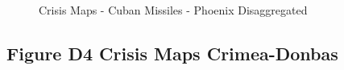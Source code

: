 \documentclass{article}
\begin{document}
\begin{sideways}%
\end{sideways}

\hphantom{em}
\begin{figure}
\caption{Crisis Maps - Cuban Missiles - Phoenix Disaggregated \label{fig:p_phoenix_plot_lv0_196}}
\end{figure}
\clearpage

\hypertarget{figure-d4-crisis-maps-crimea-donbas}{%
\subsection{Figure D4 Crisis Maps
Crimea-Donbas}\label{figure-d4-crisis-maps-crimea-donbas}}
\end{document}

